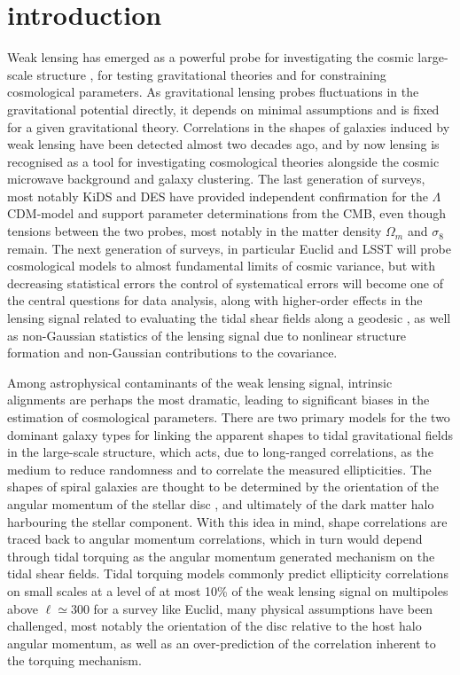 \documentclass[a4paper,fleqn,usenatbib]{mnras}
\begin{document}
\section{introduction}\label{sect_intro}
Weak lensing has emerged as a powerful probe for investigating the cosmic large-scale structure \citep{amara_optimal_2007}, for testing gravitational theories and for constraining cosmological parameters. As gravitational lensing probes fluctuations in the gravitational potential directly, it depends on minimal assumptions and is fixed for a given gravitational theory. Correlations in the shapes of galaxies induced by weak lensing have been detected almost two decades ago, and by now lensing is recognised as a tool for investigating cosmological theories alongside the cosmic microwave background and galaxy clustering. The last generation of surveys, most notably KiDS and DES \citep{Abbott:2017wau} have provided independent confirmation for the $\Lambda$CDM-model and support parameter determinations from the CMB, even though tensions between the two probes, most notably in the matter density $\Omega_m$ and $\sigma_8$ remain. The next generation of surveys, in particular Euclid \citep{Amendola:2016saw} and LSST will probe cosmological models to almost fundamental limits of cosmic variance, but with decreasing statistical errors the control of systematical errors will become one of the central questions for data analysis, along with higher-order effects in the lensing signal related to evaluating the tidal shear fields along a geodesic \citep{Ghosh:2018nsm}, as well as non-Gaussian statistics of the lensing signal due to nonlinear structure formation and non-Gaussian contributions to the covariance.

Among astrophysical contaminants of the weak lensing signal, intrinsic alignments \citep{altay_influence_2006} are perhaps the most dramatic, leading to significant biases in the estimation of cosmological parameters. There are two primary models for the two dominant galaxy types for linking the apparent shapes to tidal gravitational fields in the large-scale structure, which acts, due to long-ranged correlations, as the medium to reduce randomness and to correlate the measured ellipticities. The shapes of spiral galaxies are thought to be determined by the orientation of the angular momentum of the stellar disc \citep{bailin_internal_2005}, and ultimately of the dark matter halo harbouring the stellar component. With this idea in mind, shape correlations are traced back to angular momentum correlations, which in turn would depend through tidal torquing as the angular momentum generated mechanism on the tidal shear fields. Tidal torquing models commonly predict ellipticity correlations on small scales at a level of at most 10\% of the weak lensing signal on multipoles above $\ell\simeq300$ for a survey like Euclid, many physical assumptions have been challenged, most notably the orientation of the disc relative to the host halo angular momentum, as well as an over-prediction of the correlation inherent to the torquing mechanism.
\end{document}
